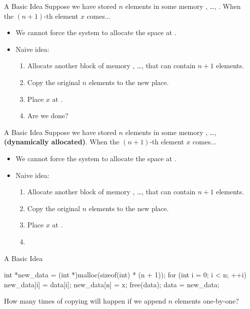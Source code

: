 \documentclass{beamer}
\begin{document}
\begin{frame}{A Basic Idea}
    Suppose we have stored \(n\) elements in some  memory , \dots, . When the \((n+1)\)-th element \(x\) comes...
    \begin{itemize}
        \item We cannot force the system to allocate the space at .
        \pause
        \item Naive idea:
        \begin{enumerate}
            \item Allocate another block of memory , \dots,  that can contain \(n+1\) elements.
            \item Copy the original \(n\) elements to the new place.
            \item Place \(x\) at .
            \pause
            \item Are we done?
        \end{enumerate}
    \end{itemize}
\end{frame}

\begin{frame}{A Basic Idea}
    Suppose we have stored \(n\) elements in some  memory , \dots,  \textbf{(dynamically allocated)}. When the \((n+1)\)-th element \(x\) comes...
    \begin{itemize}
        \item We cannot force the system to allocate the space at .
        \item Naive idea:
        \begin{enumerate}
            \item Allocate another block of memory , \dots,  that can contain \(n+1\) elements.
            \item Copy the original \(n\) elements to the new place.
            \item Place \(x\) at .
            \item {}
        \end{enumerate}
    \end{itemize}
\end{frame}

\begin{frame}[fragile]{A Basic Idea}
    \begin{cpp}
int *new_data
    = (int *)malloc(sizeof(int) * (n + 1));
for (int i = 0; i < n; ++i)
  new_data[i] = data[i];
new_data[n] = x;
free(data);
data = new_data;
    \end{cpp}
    \pause
    \begin{question}
        How many times of copying will happen if we append \(n\) elements one-by-one?
    \end{question}
\end{frame}
\end{document}

